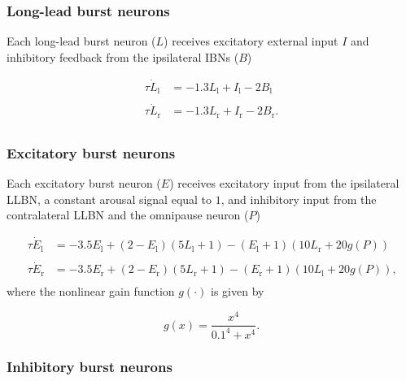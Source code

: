 \documentclass[10pt,a4paper,onecolumn]{article}
\begin{document}
\subsubsection{Long-lead burst neurons}\label{long-lead-burst-neurons}

Each long-lead burst neuron (\(L\)) receives excitatory external input
\(I\) and inhibitory feedback from the ipsilateral IBNs (\(B\))

\begin{equation}
\begin{array}{ll}
\tau\dot L_\mathrm{l} &= -1.3L_\mathrm{l}+I_\mathrm{l}-2B_\mathrm{l} \\\\
\tau\dot L_\mathrm{r} &= -1.3L_\mathrm{r}+I_\mathrm{r}-2B_\mathrm{r} \textrm{.} \\
\end{array}
\label{eq:llbn}\end{equation}

\subsubsection{Excitatory burst neurons}\label{excitatory-burst-neurons}

Each excitatory burst neuron (\(E\)) receives excitatory input from the
ipsilateral LLBN, a constant arousal signal equal to \(1\), and
inhibitory input from the contralateral LLBN and the omnipause neuron
(\(P\))

\begin{equation}
\begin{array}{ll}
\tau\dot E_\mathrm{l} &= -3.5E_\mathrm{l}+(2-E_\mathrm{l})(5L_\mathrm{l}+1)-(E_\mathrm{l}+1)(10L_\mathrm{r}+20g(P)) \\\\
\tau\dot E_\mathrm{r} &= -3.5E_\mathrm{r}+(2-E_\mathrm{r})(5L_\mathrm{r}+1)-(E_\mathrm{r}+1)(10L_\mathrm{l}+20g(P)) \textrm{,} \\
\end{array}
\label{eq:ebn}\end{equation} where the nonlinear gain function
\(g(\cdot)\) is given by

\begin{equation}
g(x) = \frac{x^4}{0.1^4+x^4} \textrm{.}
\label{eq:gain}\end{equation}

\subsubsection{Inhibitory burst neurons}\label{inhibitory-burst-neurons}
\end{document}
